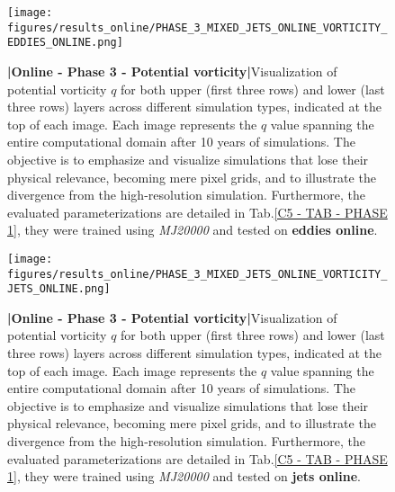 %
%
\newpage

\begin{figure}[H]
    \centering
    \texttt{[image: figures/results\_online/PHASE\_3\_MIXED\_JETS\_ONLINE\_VORTICITY\_EDDIES\_ONLINE.png]}
    \caption{\textbf{|}\textcolor{section_color}{\textbf{Online - Phase 3 - Potential vorticity}}\textbf{|}Visualization of potential vorticity $q$ for both upper (first three rows) and lower (last three rows) layers across different simulation types, indicated at the top of each image. Each image represents the $q$ value spanning the entire computational domain after 10 years of simulations. The objective is to emphasize and visualize simulations that lose their physical relevance, becoming mere pixel grids, and to illustrate the divergence from the high-resolution simulation. Furthermore, the evaluated parameterizations are detailed in Tab.\ref{C5 - TAB - PHASE 1}, they were trained using \textit{MJ20000}  and tested on \textbf{eddies online}.}
    \label{APP - ONLINE - PHASE 3 - VORTICITY -  JETS MIXED 20000 and EDDIES ONLINE}
\end{figure}

\newpage

\begin{figure}[H]
    \centering
    \texttt{[image: figures/results\_online/PHASE\_3\_MIXED\_JETS\_ONLINE\_VORTICITY\_JETS\_ONLINE.png]}
    \caption{\textbf{|}\textcolor{section_color}{\textbf{Online - Phase 3 - Potential vorticity}}\textbf{|}Visualization of potential vorticity $q$ for both upper (first three rows) and lower (last three rows) layers across different simulation types, indicated at the top of each image. Each image represents the $q$ value spanning the entire computational domain after 10 years of simulations. The objective is to emphasize and visualize simulations that lose their physical relevance, becoming mere pixel grids, and to illustrate the divergence from the high-resolution simulation. Furthermore, the evaluated parameterizations are detailed in Tab.\ref{C5 - TAB - PHASE 1}, they were trained using \textit{MJ20000}  and tested on \textbf{jets online}.}
    \label{APP - ONLINE - PHASE 3 - VORTICITY -  JETS MIXED 20000 and JETS ONLINE}
\end{figure}
